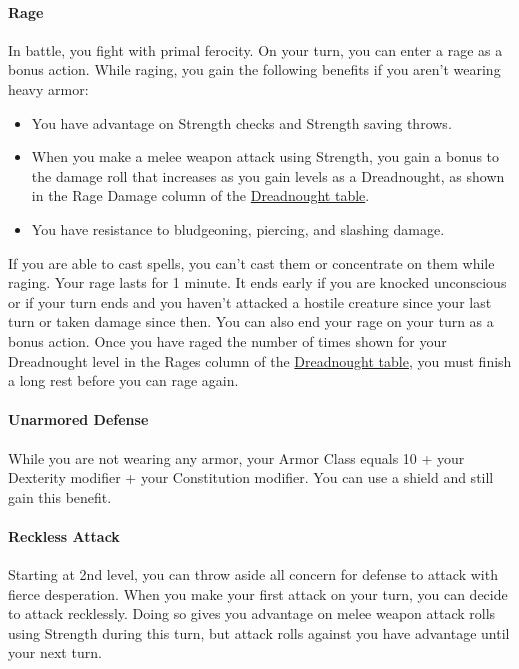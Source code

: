 \paragraph{Rage}\label{dreadnought-feature-rage}

In battle, you fight with primal ferocity. On your turn, you can enter a
rage as a bonus action. While raging, you gain the following benefits if
you aren't wearing heavy armor:

\begin{itemize}
\item
  You have advantage on Strength checks and Strength saving throws.
\item
  When you make a melee weapon attack using Strength, you gain a bonus
  to the damage roll that increases as you gain levels as a Dreadnought,
  as shown in the Rage Damage column of the
  \hyperref[dreadnought-table]{Dreadnought table}.
\item
  You have resistance to bludgeoning, piercing, and slashing damage.
\end{itemize}

If you are able to cast spells, you can't cast them or concentrate on
them while raging. Your rage lasts for 1 minute. It ends early if you
are knocked unconscious or if your turn ends and you haven't attacked a
hostile creature since your last turn or taken damage since then. You
can also end your rage on your turn as a bonus action. Once you have
raged the number of times shown for your Dreadnought level in the Rages
column of the \hyperref[dreadnought-table]{Dreadnought table}, you must
finish a long rest before you can rage again.

\paragraph{Unarmored
Defense}\label{dreadnought-feature-unarmored-defense}

While you are not wearing any armor, your Armor Class equals 10 + your
Dexterity modifier + your Constitution modifier. You can use a shield
and still gain this benefit.

\paragraph{Reckless Attack}\label{dreadnought-feature-reckless-attack}

Starting at 2nd level, you can throw aside all concern for defense to
attack with fierce desperation. When you make your first attack on your
turn, you can decide to attack recklessly. Doing so gives you advantage
on melee weapon attack rolls using Strength during this turn, but attack
rolls against you have advantage until your next turn.

